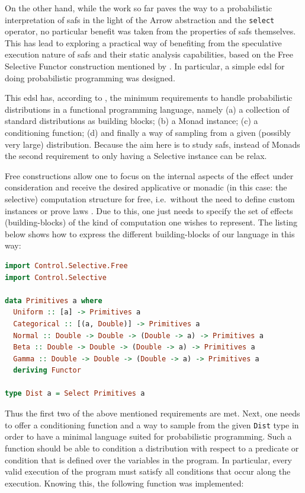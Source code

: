 \documentclass[
  oneside,
  11pt, a4paper,
  footinclude=true,
  headinclude=true,
  cleardoublepage=empty
]{scrbook}
\theoremstyle{definition}
\theoremstyle{definition}
\begin{document}
    On the other hand, while the work so far paves the way to a probabilistic interpretation of \glspl{saf} in the light of the Arrow abstraction and the \texttt{select} operator, no particular benefit was taken from the properties of \glspl{saf} themselves. This has lead to exploring a practical way of benefiting from the speculative execution nature of \glspl{saf} and their static analysis capabilities, based on the Free Selective Functor construction mentioned by \cite{andrey2019selective}. In particular, a simple \gls{edsl} for doing probabilistic programming was designed.
    
    This \gls{edsl} has, according to \cite{Scibior:2015:PPP:2887747.2804317, gordon2014probabilistic, meent2018introduction}, the minimum requirements to handle probabilistic distributions in a functional programming language, namely (a) a collection of standard distributions as building blocks; (b) a Monad instance; (c) a conditioning function; (d) and finally a way of sampling from a given (possibly very large) distribution. Because the aim here is to study \glspl{saf}, instead of Monads the second requirement to only having a Selective instance can be relax.
    
    Free constructions allow one to focus on the internal aspects of the effect under consideration and receive the desired applicative or monadic (in this case: the selective) computation structure for free, i.e.\ without the need to define custom instances or prove laws \citep{swierstra_2008}. Due to this, one just needs to specify the set of effects (building-blocks) of the kind of computation one wishes to represent. The listing below shows how to express the different building-blocks of our language in this way:
    
        \begin{lstlisting}[language=Haskell, caption={eDSL primitive building-blocks},captionpos=b]
import Control.Selective.Free
import Control.Selective

data Primitives a where
  Uniform :: [a] -> Primitives a
  Categorical :: [(a, Double)] -> Primitives a
  Normal :: Double -> Double -> (Double -> a) -> Primitives a
  Beta :: Double -> Double -> (Double -> a) -> Primitives a
  Gamma :: Double -> Double -> (Double -> a) -> Primitives a
  deriving Functor

type Dist a = Select Primitives a
        \end{lstlisting}
        
    Thus the first two of the above mentioned requirements are met. Next, one needs to offer a conditioning function and a way to sample from the given \texttt{Dist} type in order to have a minimal language suited for probabilistic programming. Such a function should be able to condition a distribution with respect to a predicate or condition that is defined over the variables in the program. In particular, every valid execution of the program must satisfy all conditions that occur along the execution. Knowing this, the following function was implemented:
    
\end{document}
